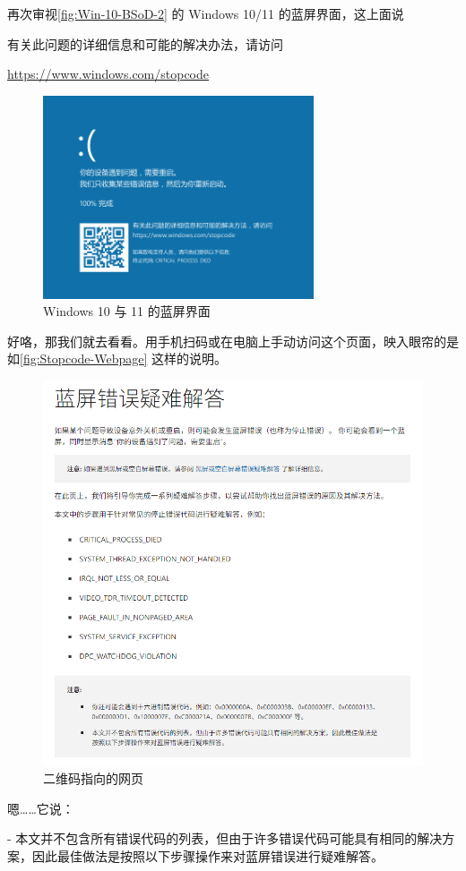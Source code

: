 {再次审视\autoref{fig:Win-10-BSoD-2} 的 Windows 10/11 的蓝屏界面，这上面说
\begin{quoting}
  有关此问题的详细信息和可能的解决办法，请访问
  
  \url{https://www.windows.com/stopcode}
\end{quoting}

\begin{figure}[htb!]
  \centering
  \includegraphics[width=8cm]{assets/advanced/Win-10-BSoD.png}
  \caption{Windows 10 与 11 的蓝屏界面}
  \label{fig:Win-10-BSoD-2}
\end{figure}

好咯，那我们就去看看。用手机扫码或在电脑上手动访问这个页面，映入眼帘的是如\autoref{fig:Stopcode-Webpage} 这样的说明。

\begin{figure}[htb!]
  \centering
  \includegraphics[width=.65\textwidth]{assets/advanced/Stopcode-Webpage.png}
  \caption{二维码指向的网页}
  \label{fig:Stopcode-Webpage}
\end{figure}

嗯……它说：

\begin{quoting}
  - 本文并不包含所有错误代码的列表，但由于许多错误代码可能具有相同的解决方案，因此最佳做法是按照以下步骤操作来对蓝屏错误进行疑难解答。
\end{quoting}

}
